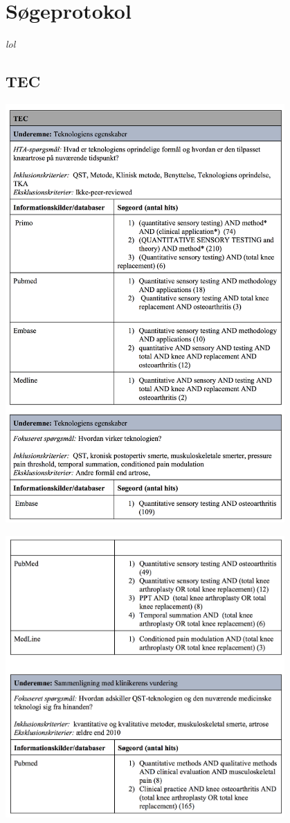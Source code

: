 \chapter{Søgeprotokol} \vspace{-.75cm}
\textit{lol}
\section{TEC}
\includegraphics[width=0.8\textwidth]{rapportAfsnit/qBilag/sogninger/TEC1}

\includegraphics[width=0.8\textwidth]{rapportAfsnit/qBilag/sogninger/TEC2}

